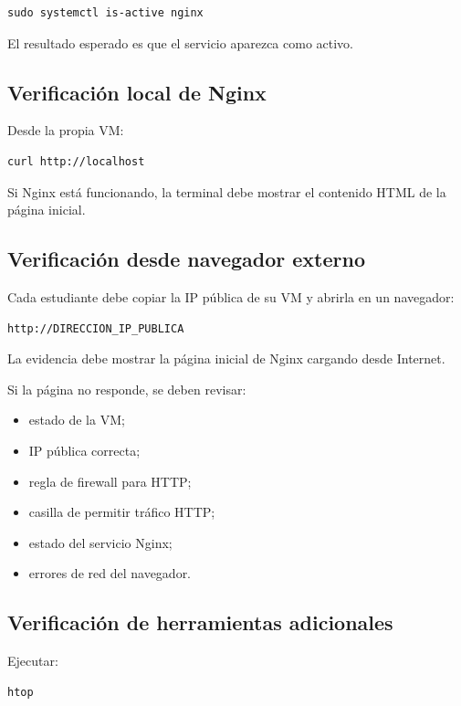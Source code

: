 \documentclass[
  coursetitle={Cómputo Nube y Tecnologías Emergentes},
  coursehours={96},
  coursedate={Verano 2026},
  doctype={Práctica},
  otherlangs={english,french},
  authorname={Lázaro},
  authorsurname={Bustio-Martínez},
  authortitle={PhD},
  role={Profesor Investigador},
  email={lbustio@inaoe.mx},
  phone={5559504000},
  ext={7459},
  institution={Instituto Nacional de Astrofísica, Óptica y Electrónica (INAOE)},
  department={Maestría en Ciencias en Tecnologías de Seguridad},
  address={Luis Enrique Erro 1, Sta. Ma. Tonantzintla, San Andrés Cholula, CP 72840, Puebla, México},
  margin={0.5in}
]{../../lbustio_lecture_notes}
\begin{document}
\begin{lstlisting}
sudo systemctl is-active nginx
\end{lstlisting}

El resultado esperado es que el servicio aparezca como activo.

\subsection{Verificación local de Nginx}

Desde la propia VM:

\begin{lstlisting}
curl http://localhost
\end{lstlisting}

Si Nginx está funcionando, la terminal debe mostrar el contenido HTML de la página inicial.

\subsection{Verificación desde navegador externo}

Cada estudiante debe copiar la IP pública de su VM y abrirla en un navegador:

\begin{lstlisting}
http://DIRECCION_IP_PUBLICA
\end{lstlisting}

La evidencia debe mostrar la página inicial de Nginx cargando desde Internet.

Si la página no responde, se deben revisar:

\begin{itemize}
    \item estado de la VM;
    \item IP pública correcta;
    \item regla de firewall para HTTP;
    \item casilla de permitir tráfico HTTP;
    \item estado del servicio Nginx;
    \item errores de red del navegador.
\end{itemize}

\subsection{Verificación de herramientas adicionales}

Ejecutar:

\begin{lstlisting}
htop
\end{lstlisting}
\end{document}

